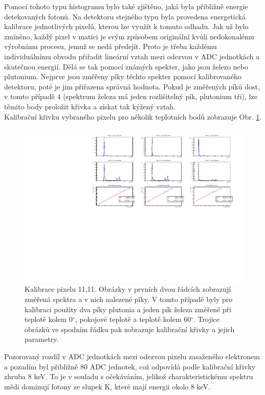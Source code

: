 Pomocí tohoto typu histogramu bylo také zjištěno, jaká byla přibližně energie detekovaných fotonů. Na detektoru stejného typu byla provedena energetická kalibrace jednotlivých pixelů, kterou lze využít k tomuto odhadu. Jak už bylo zmíněno, každý pixel v matici je svým způsobem originální kvůli nedokonalému výrobnímu procesu, jemuž se nedá předejít. Proto je třeba každému individuálnímu obvodu přiřadit lineární vztah mezi odezvou v ADC jednotkách a skutečnou energií. Dělá se tak pomocí známých spekter, jako jsou železo nebo plutonium. Nejprve jsou změřeny píky těchto spekter pomocí kalibrovaného detektoru, poté je jim přiřazena správná hodnota. Pokud je změřených píků dost, v tomto případě 4 (spektrum železa má jeden rozlišitelný pík, plutonium tři), lze těmito body proložit křivka a získat tak kýžený vztah.\\
Kalibrační křivku vybraného pixelu pro několik teplotních bodů zobrazuje Obr. \ref{Obrazek_kalibrace}.

 \begin{figure}[htbp!]
\centering
\includegraphics[scale = 0.85]{Figure/calibration.pdf}
 \caption[Kalibrace pixelu]{Kalibrace pixelu 11,11. Obrázky v prvních dvou řádcích zobrazují změřená spektra a v nich nalezené píky. V tomto případě byly pro kalibraci použity dva píky plutonia a jeden pík železa změřené při teplotě kolem 0$^{\circ}$, pokojové teplotě a teplotě kolem 60$^{\circ}$. Trojice obrázků ve spodním řádku pak zobrazuje kalibrační křivky a jejich parametry.}
\label{Obrazek_kalibrace}
\end{figure}

Pozorovaný rozdíl v ADC jednotkách mezi odezvou pixelu zasaženého elektronem a pozadím byl přibližně 80 ADC jednotek, což odpovídá podle kalibrační křivky zhruba 8 keV. To je v souladu s očekáváním, jelikož charakteristickému spektru mědi dominují fotony ze slupek K, které mají energii okolo 8 keV. 

